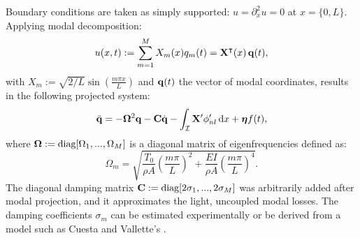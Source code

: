 Boundary conditions are taken as simply supported: $u = \partial_x^2 u = 0$ at $x = \{0, L\}$. Applying modal decomposition:
\begin{equation}\label{eq:ModalSystem}
u(x,t) := \sum_{m=1}^M X_m(x) q_m(t) = {\bf X}^\intercal(x) \, {\bf q}(t),
\end{equation}
with $X_m := \sqrt{2/L} \sin\left(\frac{m\pi x}{L}\right)$ and ${\bf q}(t)$ the vector of modal coordinates, results in the following projected system:
\begin{equation}
\ddot {\bf q} = -{\bf \Omega}^2{\bf q} - {\bf C}\dot{\bf q} - \int_{\mathcal I} {\bf X}' \phi^\prime_{nl}\,\mathrm dx + {\boldsymbol \eta} f(t),
\end{equation}
where ${\bf \Omega} := \text{diag}[\Omega_1,...,\Omega_M]$ is a diagonal matrix of eigenfrequencies defined as:
\begin{equation}
\Omega_m = \sqrt{\frac{T_0}{\rho A} \left(\frac{m\pi}{L}\right)^2 + \frac{EI}{\rho A} \left(\frac{m\pi}{L}\right)^4}.
\end{equation}
The diagonal damping matrix ${\bf C} := \text{diag}[2\sigma_1,...,2\sigma_M]$ was arbitrarily added after modal projection, and it approximates the light, uncoupled modal losses. The damping coefficients $\sigma_m$ can be estimated experimentally or be derived from a model such as Cuesta and Vallette's \cite{cuesta_nonlinear_1996}.

